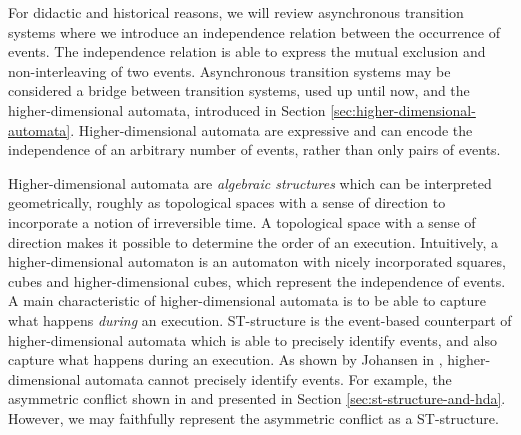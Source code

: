 For didactic and historical reasons, we will review asynchronous transition systems where we introduce an independence relation between the occurrence of events. The independence relation is able to express the mutual exclusion and non-interleaving of two events. Asynchronous transition systems may be considered a bridge between transition systems, used up until now, and the higher-dimensional automata, introduced in Section \ref{sec:higher-dimensional-automata}. Higher-dimensional automata are expressive and can encode the independence of an arbitrary number of events, rather than only pairs of events.

Higher-dimensional automata are \emph{algebraic structures} which can be interpreted geometrically, roughly as topological spaces with a sense of direction to incorporate a notion of irreversible time. A topological space with a sense of direction makes it possible to determine the order of an execution. Intuitively, a higher-dimensional automaton is an automaton with nicely incorporated squares, cubes and higher-dimensional cubes, which represent the independence of events. A main characteristic of higher-dimensional automata is to be able to capture what happens \emph{during} an execution. ST-structure is the event-based counterpart of higher-dimensional automata which is able to precisely identify events, and also capture what happens during an execution. As shown by Johansen in \cite{Johansen16STstruct}, higher-dimensional automata cannot precisely identify events. For example, the asymmetric conflict shown in \cite[Figure 5]{Johansen16STstruct} and presented in Section \ref{sec:st-structure-and-hda}. However, we may faithfully represent the asymmetric conflict as a ST-structure.